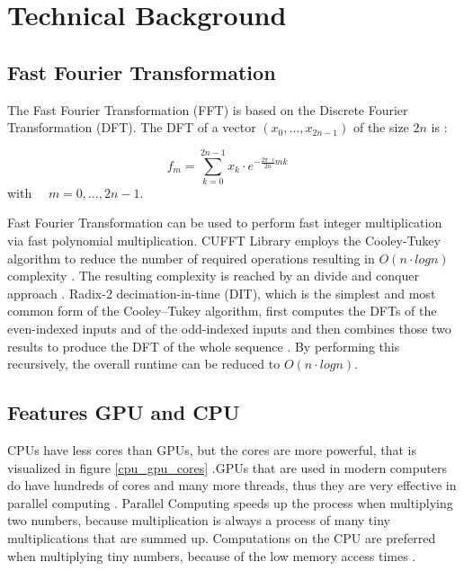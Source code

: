 \documentclass[12pt,a4paper]{article}
\begin{document}
\section{Technical Background}

\subsection{Fast Fourier Transformation}
The Fast Fourier Transformation (FFT) is based on the Discrete Fourier Transformation (DFT). The DFT of a vector $(x_{0},\dots ,x_{{2n-1}})$ of the size $2n$ is \cite{wiki:fft}:
\begin{center}
$$f_m = \sum_{k=0}^{2n-1}x_k \cdot e^{-\frac{2\pi \cdot i}{2n}mk} \quad$$ with $\quad m = 0,\dots,2n-1$.
\end{center}
Fast Fourier Transformation can be used to perform fast integer multiplication via fast polynomial multiplication. CUFFT Library employs the Cooley-Tukey algorithm to reduce the number of required operations resulting in $O(n \cdot logn)$ complexity \cite{nvidia2012cuda}. The resulting complexity is reached by an divide and conquer approach \cite{bekele2016cooley}.
Radix-2 decimation-in-time (DIT), which is the simplest and most common form of the Cooley–Tukey algorithm, first computes the DFTs of the even-indexed inputs and of the odd-indexed inputs and then combines those two results to produce the DFT of the whole sequence \cite{wiki:xxx}. By performing this recursively, the overall runtime can be reduced to $O(n \cdot logn)$.

\subsection{Features GPU and CPU}
CPUs have less cores than GPUs, but the cores are more powerful, that is visualized in figure \ref{cpu_gpu_cores} .GPUs that are used in modern computers do have hundreds of cores and many more threads, thus they are very effective in parallel computing \cite{Palacios2011ACO}. Parallel Computing speeds up the process when multiplying two numbers, because multiplication is always a process of many tiny multiplications that are summed up. Computations on the CPU are preferred when multiplying tiny numbers, because of the low memory access times \cite{albers2009grafik}.
\end{document}
